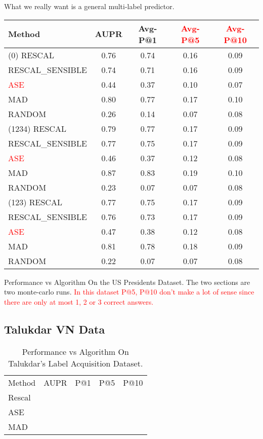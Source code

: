 \documentclass{tufte-handout}
\newcommand{\alert}[1]{\textcolor{red}{#1}}
\begin{document}
What we really want is a general multi-label predictor.
\begin{margintable}[-3in]
  \centering
  \begin{tabular}{l c c c c}
    Method & AUPR & Avg-P@1  & \alert{Avg-P@5} & \alert{Avg-P@10} \\\toprule
    (0) RESCAL &  0.76 & 0.74 & 0.16 & 0.09 \\
    RESCAL\_SENSIBLE &  0.74 & 0.71 & 0.16 & 0.09 \\
    \alert{ASE} &  0.44 & 0.37 & 0.10 & 0.07 \\
    MAD &  0.80 & 0.77 & 0.17 & 0.10 \\
    RANDOM &  0.26 & 0.14 & 0.07 & 0.08 \\\midrule
    (1234) RESCAL &  0.79 & 0.77 & 0.17 & 0.09 \\
    RESCAL\_SENSIBLE &  0.77 & 0.75 & 0.17 & 0.09 \\
    \alert{ASE} &  0.46 & 0.37 & 0.12 & 0.08 \\
    MAD &  0.87 & 0.83 & 0.19 & 0.10 \\
    RANDOM &  0.23 & 0.07 & 0.07 & 0.08 \\\midrule
    (123) RESCAL &  0.77 & 0.75 & 0.17 & 0.09 \\
    RESCAL\_SENSIBLE &  0.76 & 0.73 & 0.17 & 0.09 \\
    \alert{ASE} &  0.47 & 0.38 & 0.12 & 0.08 \\
    MAD &  0.81 & 0.78 & 0.18 & 0.09 \\
    RANDOM &  0.22 & 0.07 & 0.07 & 0.08 \\
  \end{tabular}
  \caption{Performance vs Algorithm On the US Presidents Dataset. The two sections are two monte-carlo runs.
    \alert{In this dataset P@5, P@10 don't make a lot of sense since there are only at most 1, 2 or 3 correct answers.}}
  \label{tab:perf-vs-algo-on-us-president}
\end{margintable}

\pagebreak
\subsection{Talukdar VN Data}
\label{sec:talukdar-vn-data}
\begin{table}[htbp]
  \centering
  \begin{tabular}{l c c c c}
    Method & AUPR & P@1 & P@5 & P@10 \\
    Rescal & \\
    ASE    & \\
    MAD    & \\
  \end{tabular}
  \caption{Performance vs Algorithm On Talukdar's Label Acquisition Dataset.}
  \label{tab:perf-vs-algo-on-label_acquisition}
\end{table}
\end{document}
